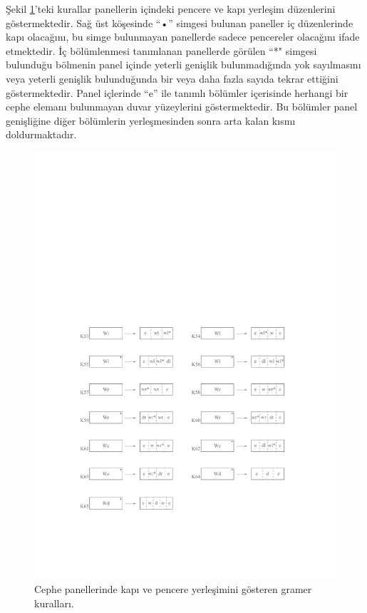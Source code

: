 \documentclass[12pt,turkish,a4paperpaper,]{report}
\begin{document}
Şekil \ref{KPaneller2}'teki kurallar panellerin içindeki pencere ve kapı
yerleşim düzenlerini göstermektedir. Sağ üst köşesinde ``•'' simgesi
bulunan paneller iç düzenlerinde kapı olacağını, bu simge bulunmayan
panellerde sadece pencereler olacağını ifade etmektedir. İç bölümlenmesi
tanımlanan panellerde görülen ``*" simgesi bulunduğu bölmenin panel
içinde yeterli genişlik bulunmadığında yok sayılmasını veya yeterli
genişlik bulunduğunda bir veya daha fazla sayıda tekrar ettiğini
göstermektedir. Panel içlerinde ``e'' ile tanımlı bölümler içerisinde
herhangi bir cephe elemanı bulunmayan duvar yüzeylerini göstermektedir.
Bu bölümler panel genişliğine diğer bölümlerin yerleşmesinden sonra arta
kalan kısmı doldurmaktadır.

\begin{figure}
\centering
\includegraphics[width=1\textwidth,height=\textheight]{source/figures/KPaneller2.pdf}
\caption{Cephe panellerinde kapı ve pencere yerleşimini gösteren gramer
kuralları. \label{KPaneller2}}
\end{figure}
\end{document}

